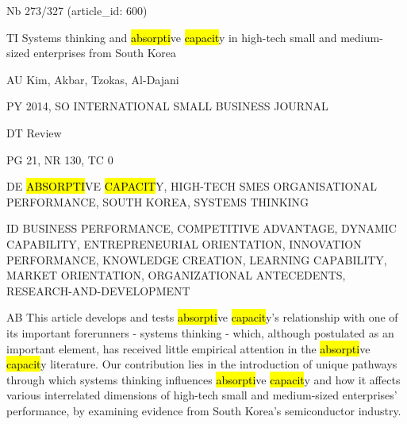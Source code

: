 \documentclass[a4paper]{article}
\begin{document}
\vspace*{-2cm}
Nb \tabto{0cm}273/327 (article\_id: 600)\par
TI \tabto{0cm}Systems thinking and \hl{absorpti}ve \hl{capacit}y in high-tech small and medium-sized enterprises from South Korea\par
AU \tabto{0cm}Kim, Akbar, Tzokas, Al-Dajani\par
PY \tabto{0cm}2014, SO INTERNATIONAL SMALL BUSINESS JOURNAL\par
DT \tabto{0cm}Review\par
PG \tabto{0cm}21, NR 130, TC 0\par
DE \tabto{0cm}\hl{ABSORPTI}VE \hl{CAPACIT}Y, HIGH-TECH SMES ORGANISATIONAL PERFORMANCE, SOUTH KOREA, SYSTEMS THINKING\par
ID \tabto{0cm}BUSINESS PERFORMANCE, COMPETITIVE ADVANTAGE, DYNAMIC CAPABILITY, ENTREPRENEURIAL ORIENTATION, INNOVATION PERFORMANCE, KNOWLEDGE CREATION, LEARNING CAPABILITY, MARKET ORIENTATION, ORGANIZATIONAL ANTECEDENTS, RESEARCH-AND-DEVELOPMENT\par
AB \tabto{0cm}This article develops and tests \hl{absorpti}ve \hl{capacit}y's relationship with one of its important forerunners - systems thinking - which, although postulated as an important element, has received little empirical attention in the \hl{absorpti}ve \hl{capacit}y literature. Our contribution lies in the introduction of unique pathways through which systems thinking influences \hl{absorpti}ve \hl{capacit}y and how it affects various interrelated dimensions of high-tech small and medium-sized enterprises' performance, by examining evidence from South Korea's semiconductor industry.\par
\clearpage
\end{document}

